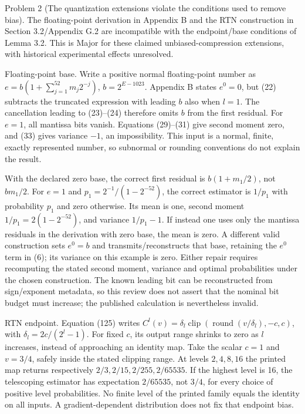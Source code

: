 \documentclass[10pt]{article}
\begin{document}
Problem 2 (The quantization extensions violate the conditions used to remove bias).  The floating-point derivation in Appendix B and the RTN construction in Section 3.2/Appendix G.2 are incompatible with the endpoint/base conditions of Lemma 3.2. This is Major for these claimed unbiased-compression extensions, with historical experimental effects unresolved.\par
Floating-point base. Write a positive normal floating-point number as \(e=b(1+\sum_{j=1}^{52}m_j2^{-j})\), \(b=2^{E-1023}\). Appendix B states \(e^0=0\), but (22) subtracts the truncated expression with leading \(b\) also when \(l=1\). The cancellation leading to (23)–(24) therefore omits \(b\) from the first residual. For \(e=1\), all mantissa bits vanish. Equations (29)–(31) give second moment zero, and (33) gives variance \(-1\), an impossibility. This input is a normal, finite, exactly represented number, so subnormal or rounding conventions do not explain the result.\par
With the declared zero base, the correct first residual is \(b(1+m_1/2)\), not \(bm_1/2\). For \(e=1\) and \(p_1=2^{-1}/(1-2^{-52})\), the correct estimator is \(1/p_1\) with probability \(p_1\) and zero otherwise. Its mean is one, second moment \(1/p_1=2(1-2^{-52})\), and variance \(1/p_1-1\). If instead one uses only the mantissa residuals in the derivation with zero base, the mean is zero. A different valid construction sets \(e^0=b\) and transmits/reconstructs that base, retaining the \(e^0\) term in (6); its variance on this example is zero. Either repair requires recomputing the stated second moment, variance and optimal probabilities under the chosen construction. The known leading bit can be reconstructed from sign/exponent metadata, so this review does not assert that the nominal bit budget must increase; the published calculation is nevertheless invalid.\par
RTN endpoint. Equation (125) writes \(C^l(v)=\delta_l\operatorname{clip}(\operatorname{round}(v/\delta_l),-c,c)\), with \(\delta_l=2c/(2^l-1)\). For fixed \(c\), its output range shrinks to zero as \(l\) increases, instead of approaching an identity map. Take the scalar \(c=1\) and \(v=3/4\), safely inside the stated clipping range. At levels \(2,4,8,16\) the printed map returns respectively \(2/3,2/15,2/255,2/65535\). If the highest level is 16, the telescoping estimator has expectation \(2/65535\), not \(3/4\), for every choice of positive level probabilities. No finite level of the printed family equals the identity on all inputs. A gradient-dependent distribution does not fix that endpoint bias.\par
\end{document}
